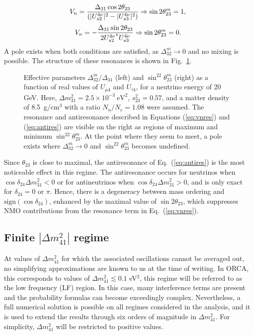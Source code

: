 \begin{equation}
    \label{eq:vnres}
    V_n = \frac{\Delta_{31}\cos2\theta_{23}}{(|U^{4\nu}_{s2}|^2-|U^{4\nu}_{s3}|^2)} \Rightarrow  \sin2\theta_{23}^m=1 ,
\end{equation}
\begin{equation}
    \label{eq:antires}
    V_n = -\frac{\Delta_{31}\sin2\theta_{23}}{2{U^{4\nu}_{s2}}^*U^{4\nu}_{s3}} \Rightarrow  \sin2\theta_{23}^m=0 .
\end{equation}
A pole exists when both conditions are satisfied, as $\Delta_{32}^m\rightarrow0$ and no mixing is possible. The structure of these resonances is shown in Fig.~\ref{fig:23res}.
\begin{figure}
    \centering
    \caption{Effective parameters $\Delta_{32}^m/\Delta_{31}$ (left) and $\sin^22\theta_{23}^m$ (right) as a function of real values of $U_{\mu4}$ and $U_{\tau4}$, for a neutrino energy of 20 GeV. Here, $\Delta{m^2_{31}}=2.5\times10^{-3}~\mathrm{eV}^2$, $s_{23}^2=0.57$, and a matter density of 8.5~g/cm$^3$ with a ratio $N_n/N_e=1.08$ were assumed. The resonance and antiresonance described in Equations (\ref{eq:vnres}) and (\ref{eq:antires}) are visible on the right as regions of maximum and minimum $\sin^22\theta_{23}^m$. At the point where they seem to meet, a pole exists where $\Delta_{32}^m\rightarrow0$ and $\sin^22\theta_{23}^m$ becomes undefined.}
    \label{fig:23res}
\end{figure}
Since $\theta_{23}$ is close to maximal, the antiresonance of Eq.~(\ref{eq:antires}) is the most noticeable effect in this regime. The antiresonance occurs for neutrinos when $\cos\delta_{24}\Delta{m^2_{31}}<0$ or for antineutrinos when $\cos\delta_{24}\Delta{m^2_{31}}>0$, and is only exact for $\delta_{24}=0\mbox{ or }\pi$. Hence, there is a degeneracy between mass ordering and $\mathrm{sign}(\cos\delta_{24})$, enhanced by the maximal value of $\sin2\theta_{23}$, which suppresses NMO contributions from the resonance term in Eq.~(\ref{eq:vnres}).

\subsection{Finite $|\Delta{m^2_{41}}|$ regime}

At values of $\Delta{m^2_{41}}$ for which the associated oscillations cannot be averaged out, no simplifying approximations are known to us at the time of writing. In ORCA, this corresponds to values of $\Delta{m^2_{41}} \lesssim 0.1$ eV$^2$, this regime will be referred to as the low frequency (LF) region. In this case, many interference terms are present and the probability formulas can become exceedingly complex. Nevertheless, a full numerical solution is possible on all regimes considered in the analysis, and it is used to extend the results through six orders of magnitude in $\Delta{m^2_{41}}$. For simplicity, $\Delta{m^2_{41}}$ will be restricted to positive values.
